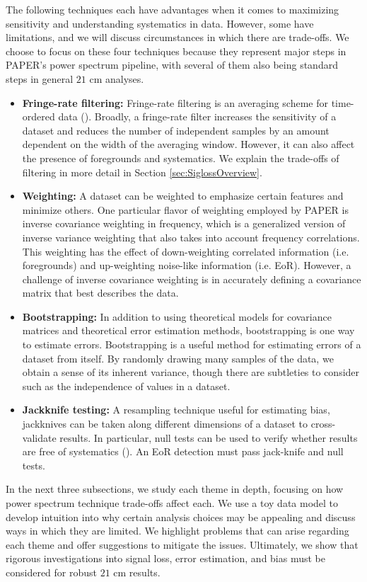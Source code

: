 \documentclass[preprint2,numberedappendix,tighten]{aastex6}  %
\begin{document}
The following techniques each have advantages when it comes to maximizing sensitivity and understanding systematics in data. However, some have limitations, and we will discuss circumstances in which there are trade-offs. We choose to focus on these four techniques because they represent major steps in PAPER's power spectrum pipeline, with several of them also being standard steps in general $21$ cm analyses.
\begin{itemize}
\item \textbf{Fringe-rate filtering:} Fringe-rate filtering is an averaging scheme for time-ordered data (\citealt{parsons_et_al2016}). Broadly, a fringe-rate filter increases the sensitivity of a dataset and reduces the number of independent samples by an amount dependent on the width of the averaging window. However, it can also affect the presence of foregrounds and systematics. We explain the trade-offs of filtering in more detail in Section \ref{sec:SiglossOverview}.
\item \textbf{Weighting:} A dataset can be weighted to emphasize certain features and minimize others. One particular flavor of weighting employed by PAPER is inverse covariance weighting in frequency, which is a generalized version of inverse variance weighting that also takes into account frequency correlations. This weighting has the effect of down-weighting correlated information (i.e. foregrounds) and up-weighting noise-like information (i.e. EoR). However, a challenge of inverse covariance weighting is in accurately defining a covariance matrix that best describes the data. 
\item \textbf{Bootstrapping:} In addition to using theoretical models for covariance matrices and theoretical error estimation methods, bootstrapping is one way to estimate errors. Bootstrapping is a useful method for estimating errors of a dataset from itself. By randomly drawing many samples of the data, we obtain a sense of its inherent variance, though there are subtleties to consider such as the independence of values in a dataset.
\item \textbf{Jackknife testing:} A resampling technique useful for estimating bias, jackknives can be taken along different dimensions of a dataset to cross-validate results. In particular, null tests can be used to verify whether results are free of systematics (\citealt{keating_et_al2016}). An EoR detection must pass jack-knife and null tests.
\end{itemize}

In the next three subsections, we study each theme in depth, focusing on how power spectrum technique trade-offs affect each. We use a toy data model to develop intuition into why certain analysis choices may be appealing and discuss ways in which they are limited. We highlight problems that can arise regarding each theme and offer suggestions to mitigate the issues. Ultimately, we show that rigorous investigations into signal loss, error estimation, and bias must be considered for robust $21$ cm results.
\end{document}
